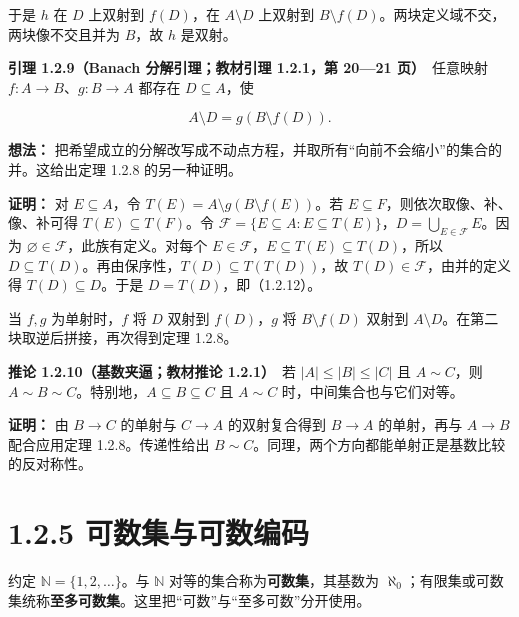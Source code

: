 \documentclass[11pt,a4paper]{article}
\begin{document}
于是 \(h\) 在 \(D\) 上双射到 \(f(D)\)，在 \(A\setminus D\) 上双射到
\(B\setminus f(D)\)。两块定义域不交，两块像不交且并为 \(B\)，故 \(h\)
是双射。

\textbf{引理 1.2.9（Banach 分解引理；教材引理 1.2.1，第 20---21
页）}　任意映射 \(f:A\to B\)、\(g:B\to A\) 都存在 \(D\subseteq A\)，使

\begin{equation*}
A\setminus D=g(B\setminus f(D)).
\tag{1.2.12}
\end{equation*}

\textbf{想法：}
把希望成立的分解改写成不动点方程，并取所有``向前不会缩小''的集合的并。这给出定理
1.2.8 的另一种证明。

\textbf{证明：} 对 \(E\subseteq A\)，令
\(T(E)=A\setminus g(B\setminus f(E))\)。若
\(E\subseteq F\)，则依次取像、补、像、补可得 \(T(E)\subseteq T(F)\)。令
\(\mathcal F=\{E\subseteq A:E\subseteq T(E)\}\)，\(D=\bigcup_{E\in\mathcal F}E\)。因为
\(\varnothing\in\mathcal F\)，此族有定义。对每个
\(E\in\mathcal F\)，\(E\subseteq T(E)\subseteq T(D)\)，所以
\(D\subseteq T(D)\)。再由保序性，\(T(D)\subseteq T(T(D))\)，故
\(T(D)\in\mathcal F\)，由并的定义得 \(T(D)\subseteq D\)。于是
\(D=T(D)\)，即（1.2.12）。

当 \(f,g\) 为单射时，\(f\) 将 \(D\) 双射到 \(f(D)\)，\(g\) 将
\(B\setminus f(D)\) 双射到
\(A\setminus D\)。在第二块取逆后拼接，再次得到定理 1.2.8。

\textbf{推论 1.2.10（基数夹逼；教材推论 1.2.1）}　若 \(|A|\le|B|\le|C|\)
且 \(A\sim C\)，则
\(A\sim B\sim C\)。特别地，\(A\subseteq B\subseteq C\) 且 \(A\sim C\)
时，中间集合也与它们对等。

\textbf{证明：} 由 \(B\to C\) 的单射与 \(C\to A\) 的双射复合得到
\(B\to A\) 的单射，再与 \(A\to B\) 配合应用定理 1.2.8。传递性给出
\(B\sim C\)。同理，两个方向都能单射正是基数比较的反对称性。

\section[\S{}1.2.5
可数集与可数编码]{1.2.5
可数集与可数编码}\label{ux53efux6570ux96c6ux4e0eux53efux6570ux7f16ux7801}

约定 \(\mathbb N=\{1,2,\ldots\}\)。与 \(\mathbb N\)
对等的集合称为\textbf{可数集}，其基数为
\(\aleph_0\)；有限集或可数集统称\textbf{至多可数集}。这里把``可数''与``至多可数''分开使用。
\end{document}

